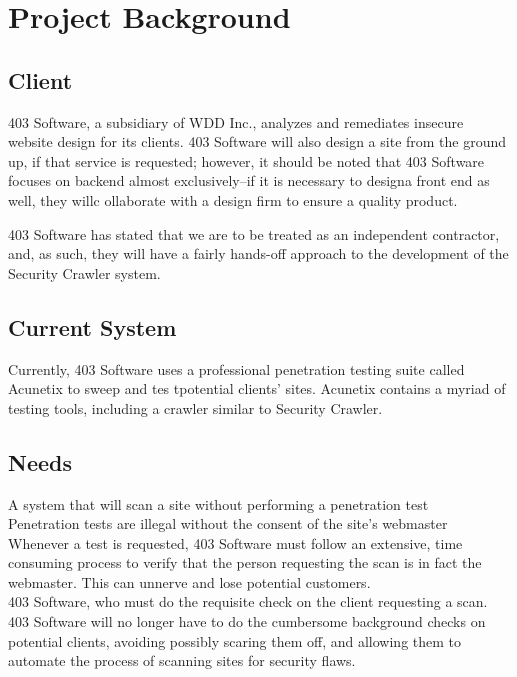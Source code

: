 \section{Project Background}
\subsection{Client}

403 Software, a subsidiary of WDD Inc., analyzes and remediates insecure website design for its clients.  403 Software will also design a site from the ground up, if that service is requested; however, it should be noted that 403 Software focuses on backend almost exclusively--if it is necessary to designa  front end as well, they willc ollaborate with a design firm to ensure a quality product.

403 Software has stated that we are to be treated as an independent contractor, and, as such, they will have a fairly hands-off approach to the development of the Security Crawler system.

\subsection{Current System}

Currently, 403 Software uses a professional penetration testing suite called Acunetix to sweep and tes tpotential clients' sites.  Acunetix contains a myriad of testing tools, including a crawler similar to Security Crawler.

\subsection{Needs}

A system that will scan a site without performing a penetration test\\Penetration tests are illegal without the consent of the site's webmaster\\Whenever a test is requested, 403 Software must follow an extensive, time consuming process to verify that the person requesting the scan is in fact the webmaster.  This can unnerve and lose potential customers.\\403 Software, who must do the requisite check on the client requesting a scan.\\403 Software will no longer have to do the cumbersome background checks on potential clients, avoiding possibly scaring them off, and allowing them to automate the process of scanning sites for security flaws.

